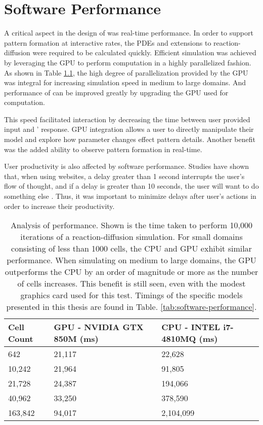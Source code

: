 \chapter{Software Performance}
A critical aspect in the design of \ProgramName{} was real-time performance. In order to support pattern formation at interactive rates, the PDEs and extensions to reaction-diffusion were required to be calculated quickly. Efficient simulation was achieved by leveraging the GPU to perform computation in a highly parallelized fashion. As shown in Table \ref{tab:perf}, the high degree of parallelization provided by the GPU was integral for increasing simulation speed in medium to large domains.   And performance of \ProgramName{} can be improved greatly by upgrading the GPU used for computation.

This speed facilitated interaction by decreasing the time between user provided input and \ProgramName{}' response. GPU integration allows a user to directly manipulate their model and explore how parameter changes effect pattern details. Another benefit was the added ability to observe pattern formation in real-time.

User productivity is also affected by software performance. Studies have shown that, when using websites, a delay greater than 1 second interrupts the user's flow of thought, and if a delay is greater than 10 seconds, the user will want to do something else \citep{nielsen1994}. Thus, it was important to minimize delays after user's actions in order to increase their productivity.

\begin{table}[p]
	\centering
	\begin{tabular}{lll} \hline
	Cell Count & GPU - NVIDIA GTX 850M (ms)    & CPU - INTEL i7-4810MQ (ms)\\ \hline
	642      & 21,117 & 22,628    \\
	10,242   & 21,964 & 91,805    \\
	21,728   & 24,387 & 194,066   \\
	40,962   & 33,250 & 378,590   \\
	163,842  & 94,017 & 2,104,099 \\ \hline 
	\end{tabular}
	\caption[Analysis of \ProgramName{} performance]{Analysis of \ProgramName{} performance. Shown is the time taken to perform 10,000 iterations of a reaction-diffusion simulation. For small domains consisting of less than 1000 cells, the CPU and GPU exhibit similar performance. When simulating on medium to large domains, the GPU outperforms the CPU by an order of magnitude or more as the number of cells increases. This benefit is still seen, even with the modest graphics card used for this test. Timings of the specific models presented in this thesis are found in Table. \ref{tab:software-performance}.}
	\label{tab:perf}
\end{table}
